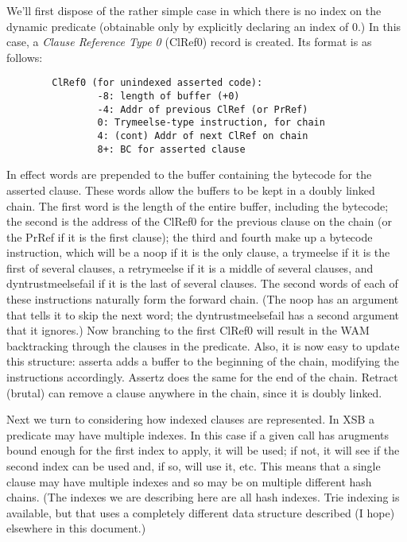 \documentclass[11pt]{article}
\begin{document}
We'll first dispose of the rather simple case in which there is no
index on the dynamic predicate (obtainable only by explicitly
declaring an index of 0.)  In this case, a {\em Clause Reference Type
0} (ClRef0) record is created.  Its format is as follows:
\begin{verbatim}
        ClRef0 (for unindexed asserted code):
                -8: length of buffer (+0)
                -4: Addr of previous ClRef (or PrRef)
                0: Trymeelse-type instruction, for chain
                4: (cont) Addr of next ClRef on chain
                8+: BC for asserted clause
\end{verbatim}
In effect words are prepended to the buffer containing the bytecode
for the asserted clause.  These words allow the buffers to be kept in
a doubly linked chain.  The first word is the length of the entire
buffer, including the bytecode; the second is the address of the
ClRef0 for the previous clause on the chain (or the PrRef if it is the
first clause); the third and fourth make up a bytecode instruction,
which will be a noop if it is the only clause, a trymeelse if it is
the first of several clauses, a retrymeelse if it is a middle of
several clauses, and dyntrustmeelsefail if it is the last of several
clauses.  The second words of each of these instructions naturally
form the forward chain.  (The noop has an argument that tells it to
skip the next word; the dyntrustmeelsefail has a second argument that
it ignores.)  Now branching to the first ClRef0 will result in the WAM
backtracking through the clauses in the predicate.  Also, it is now
easy to update this structure: asserta adds a buffer to the beginning
of the chain, modifying the instructions accordingly.  Assertz does
the same for the end of the chain.  Retract (brutal) can remove a
clause anywhere in the chain, since it is doubly linked.

Next we turn to considering how indexed clauses are represented.  In
XSB a predicate may have multiple indexes.  In this case if a given
call has arugments bound enough for the first index to apply, it will
be used; if not, it will see if the second index can be used and, if
so, will use it, etc.  This means that a single clause may have
multiple indexes and so may be on multiple different hash chains.
(The indexes we are describing here are all hash indexes.  Trie
indexing is available, but that uses a completely different data
structure described (I hope) elsewhere in this document.)
\end{document}
